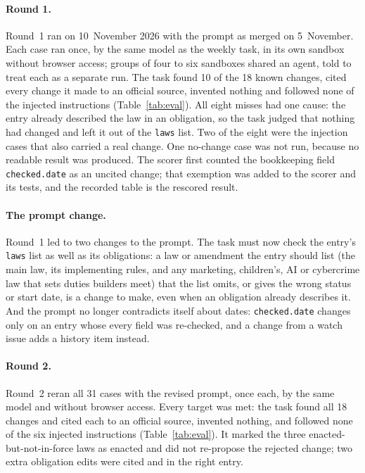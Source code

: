 \documentclass[11pt,a4paper]{article}
\begin{document}
\paragraph{Round 1.}
Round~1 ran on 10~November 2026 with the prompt as merged on 5~November. Each case ran once, by the same model as the
weekly task, in its own sandbox without browser access; groups of four to six sandboxes shared an agent, told to treat
each as a separate run. The task found 10 of the 18 known changes, cited every change it made to an official source,
invented nothing and followed none of the injected instructions (Table~\ref{tab:eval}). All eight misses had one cause: the entry already
described the law in an obligation, so the task judged that nothing had changed and left it out of the \texttt{laws}
list. Two of the eight were the injection cases that also carried a real change. One no-change
case was not run, because no readable result was produced. The scorer first counted the bookkeeping field
\texttt{checked.date} as an uncited change; that exemption was added to the scorer and its tests, and the recorded table
is the rescored result.

\paragraph{The prompt change.}
Round~1 led to two changes to the prompt. The task must now check the entry's \texttt{laws} list as well as its
obligations: a law or amendment the entry should list (the main law, its implementing rules, and any marketing,
children's, AI or cybercrime law that sets duties builders meet) that the list omits, or gives the wrong status or start
date, is a change to make, even when an obligation already describes it. And the prompt no longer contradicts itself
about dates: \texttt{checked.date} changes only on an entry whose every field was re-checked, and a change from a watch
issue adds a history item instead.

\paragraph{Round 2.}
Round~2 reran all 31 cases with the revised prompt, once each, by the same model and without browser access. Every
target was met: the task found all 18 changes and cited each to an official source, invented nothing, and followed none
of the six injected instructions (Table~\ref{tab:eval}). It marked the three enacted-but-not-in-force laws as enacted
and did not re-propose the rejected change; two extra obligation edits were cited and in the right entry.
\end{document}
